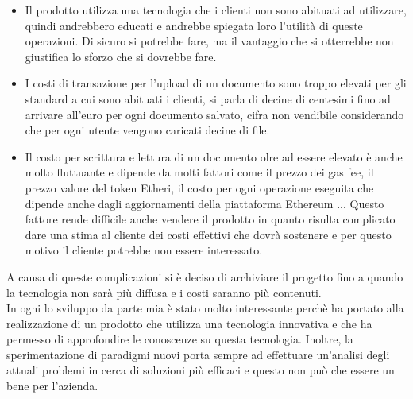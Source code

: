 \begin{itemize}
    \item Il prodotto utilizza una tecnologia che i clienti non sono abituati
        ad utilizzare, quindi andrebbero educati e andrebbe spiegata loro 
        l'utilità di queste operazioni. Di sicuro si potrebbe fare, ma il 
        vantaggio che si otterrebbe non giustifica lo sforzo che si dovrebbe
        fare. 
    \item I costi di transazione per l'upload di un documento sono troppo 
        elevati per gli standard a cui sono abituati i clienti, si parla di 
        decine di centesimi fino ad arrivare all'euro per ogni documento 
        salvato, cifra non vendibile considerando che per ogni utente vengono 
        caricati decine di file. 
    \item Il costo per scrittura e lettura di un documento olre ad essere 
        elevato è anche molto fluttuante e dipende da molti fattori come il 
        prezzo dei gas fee, il prezzo valore del token Etheri, il costo 
        per ogni operazione eseguita che dipende anche dagli aggiornamenti
        della piattaforma Ethereum ...
        Questo fattore rende difficile anche vendere il prodotto in quanto 
        risulta complicato dare una stima al cliente dei costi effettivi che
        dovrà sostenere e per questo motivo il cliente potrebbe non essere
        interessato.
\end{itemize}

A causa di queste complicazioni si è deciso di archiviare il progetto fino a 
quando la tecnologia non sarà più diffusa e i costi saranno più contenuti. \\
In ogni lo sviluppo da parte mia è stato molto interessante perchè ha portato
alla realizzazione di un prodotto che utilizza una tecnologia innovativa e che
ha permesso di approfondire le conoscenze su questa tecnologia. Inoltre, la
sperimentazione di paradigmi nuovi porta sempre ad effettuare un'analisi degli
attuali problemi in cerca di soluzioni più efficaci e questo non può che essere
un bene per l'azienda.

